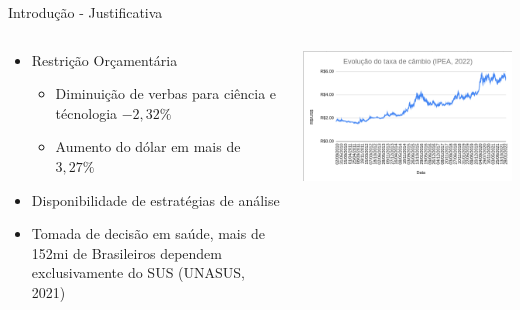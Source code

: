 \documentclass[10pt,brazil]{beamer}
\theoremstyle{definition}
\begin{document}
\begin{frame}{Introdução - Justificativa}
  \begin{columns}
    \begin{column}{0.5\textwidth}
      \begin{itemize}
        \item Restrição Orçamentária
              \begin{itemize}
                \item Diminuição de verbas para ciência e técnologia $-2,32\%$
                \item Aumento do dólar em mais de $3,27\%$
              \end{itemize}
        \item Disponibilidade de estratégias de análise
        \item Tomada de decisão em saúde, mais de 152mi de Brasileiros dependem exclusivamente do SUS (UNASUS, 2021)
      \end{itemize}
    \end{column}
    \begin{column}{0.5\textwidth}  %
      \begin{center}
        \includegraphics[width=1\textwidth]{variacaodolar.png}
      \end{center}
    \end{column}
  \end{columns}
\end{frame}

\end{document}
